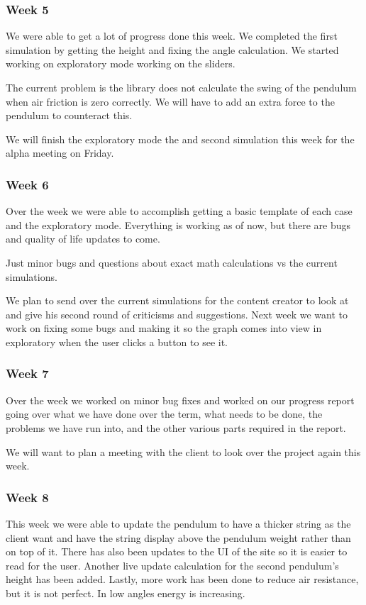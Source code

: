 \subsubsection{Week 5}
We were able to get a lot of progress done this week. We completed the first simulation by getting the height and fixing the angle calculation. We started working on exploratory mode working on the sliders.

The current problem is the library does not calculate the swing of the pendulum when air friction  is zero correctly. We will have to add an extra force to the pendulum to counteract this.

We will finish the exploratory mode the and second simulation this week for the alpha meeting on Friday.

\subsubsection{Week 6}
Over the week we were able to accomplish getting a basic template of each case and the exploratory mode. Everything is working as of now, but there are bugs and quality of life updates to come.

Just minor bugs and questions about exact math calculations vs the current simulations.

We plan to send over the current simulations for the content creator to look at and give his second round of criticisms and suggestions. Next week we want to work on fixing some bugs and making it so the graph comes into view in exploratory when the user clicks a button to see it.

\subsubsection{Week 7}
Over the week we worked on minor bug fixes and worked on our progress report going over what we have done over the term, what needs to be done, the problems we have run into, and the other various parts required in the report.

We will want to plan a meeting with the client to look over the project again this week.

\subsubsection{Week 8}
This week we were able to update the pendulum to have a thicker string as the client want and have the string display above the pendulum weight rather than on top of it. There has also been updates to the UI of the site so it is easier to read for the user. Another live update calculation for the second pendulum's height has been added. Lastly, more work has been done to reduce air resistance, but it is not perfect. In low angles energy is increasing.

